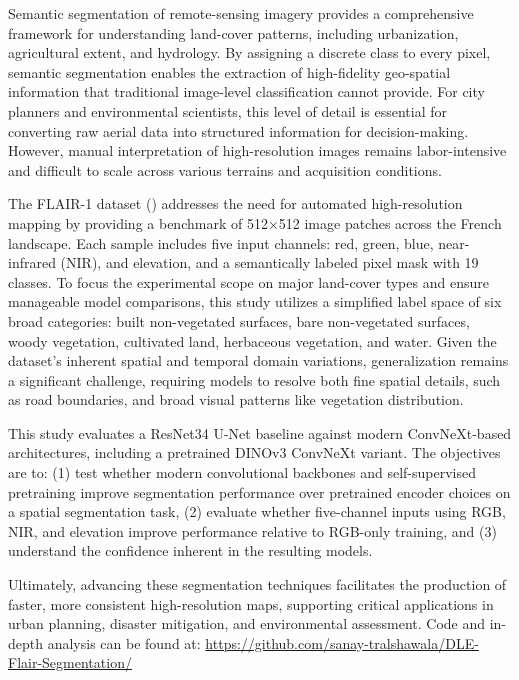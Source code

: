 \documentclass{article}
\begin{document}
Semantic segmentation of remote-sensing imagery provides a comprehensive framework for understanding land-cover patterns, including urbanization, agricultural extent, and hydrology. By assigning a discrete class to every pixel, semantic segmentation enables the extraction of high-fidelity geo-spatial information that traditional image-level classification cannot provide. For city planners and environmental scientists, this level of detail is essential for converting raw aerial data into structured information for decision-making. However, manual interpretation of high-resolution images remains labor-intensive and difficult to scale across various terrains and acquisition conditions.

The FLAIR-1 dataset (\cite{ign2022flair1}) addresses the need for automated high-resolution mapping by providing a benchmark of 512×512 image patches across the French landscape. Each sample includes five input channels: red, green, blue, near-infrared (NIR), and elevation, and a semantically labeled pixel mask with 19 classes. To focus the experimental scope on major land-cover types and ensure manageable model comparisons, this study utilizes a simplified label space of six broad categories: built non-vegetated surfaces, bare non-vegetated surfaces, woody vegetation, cultivated land, herbaceous vegetation, and water. Given the dataset's inherent spatial and temporal domain variations, generalization remains a significant challenge, requiring models to resolve both fine spatial details, such as road boundaries, and broad visual patterns like vegetation distribution.

This study evaluates a ResNet34 U-Net baseline against modern ConvNeXt-based architectures, including a pretrained DINOv3 ConvNeXt variant. The objectives are to: (1) test whether modern convolutional backbones and self-supervised pretraining improve segmentation performance over pretrained encoder choices on a spatial segmentation task, (2) evaluate whether five-channel inputs using RGB, NIR, and elevation improve performance relative to RGB-only training, and (3) understand the confidence inherent in the resulting models.

Ultimately, advancing these segmentation techniques facilitates the production of faster, more consistent high-resolution maps, supporting critical applications in urban planning, disaster mitigation, and environmental assessment. Code and in-depth analysis can be found at: 
\url{https://github.com/sanay-tralshawala/DLE-Flair-Segmentation/}
\end{document}
